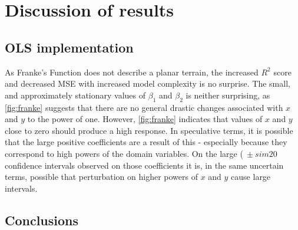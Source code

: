 \documentclass[%
oneside,                 %
final,                   %
10pt]{article}
\begin{document}
\section{Discussion of results}
\subsection{OLS implementation}
As Franke's Function does not describe a planar terrain, the increased $R^2$ score and decreased MSE with increased model complexity  is no surprise.  The small, and approximately stationary values of $\beta_1$ and $\beta_2$  is neither surprising, as \ref{fig:franke} suggests that there are no general drastic changes associated with $x$ and $y$ to the power of one. However, \ref{fig:franke} indicates that values of $x$ and $y$ close to zero should produce a high response. In speculative terms, it is possible that the large positive coefficients are a result of this - especially because they correspond to high powers of the domain variables. On the large ($\ \pm sim 20$ confidence intervals observed on those coefficients it is, in the same uncertain terms, possible that perturbation on higher powers of $x$ and $y$ cause large intervals.

\subsection{Conclusions}





\end{document}
